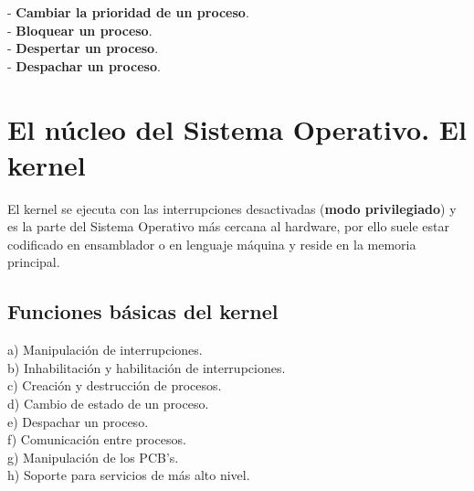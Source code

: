 \documentclass[spanish, 12pt]{article}
\begin{document}
			- \textbf{Cambiar la prioridad de un proceso}.\\
			
			- \textbf{Bloquear un proceso}.\\
			
			- \textbf{Despertar un proceso}.\\
			
			- \textbf{Despachar un proceso}.\\
			
			\newpage
			
	\section{El núcleo del Sistema Operativo. El kernel}
	
		\vfill
			
		El kernel se ejecuta con las interrupciones desactivadas (\textbf{modo privilegiado}) y es la parte del Sistema Operativo más cercana al hardware, por ello suele estar codificado en ensamblador o en lenguaje máquina y reside en la memoria principal.\\
		
		\subsection{Funciones básicas del kernel}
		
			a) Manipulación de interrupciones.\\
			
			b) Inhabilitación y habilitación de interrupciones.\\
			
			c) Creación y destrucción de procesos.\\
			
			d) Cambio de estado de un proceso.\\
			
			e) Despachar un proceso.\\
			
			f) Comunicación entre procesos.\\
			
			g) Manipulación de los PCB's.\\
			
			h) Soporte para servicios de más alto nivel.\\
			
			\newpage
			
\end{document}
